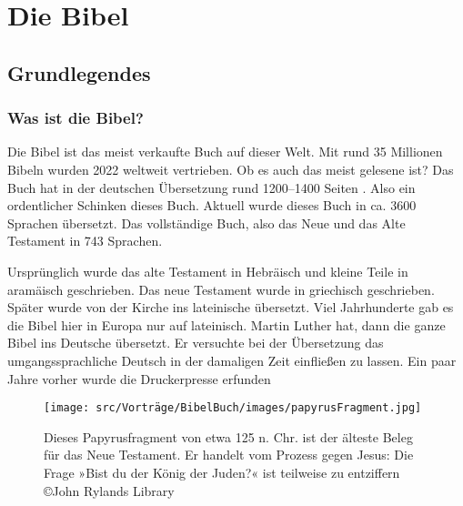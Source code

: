 \section{Die Bibel}
\subsection{Grundlegendes}
\subsubsection{Was ist die Bibel?}
Die Bibel ist das meist verkaufte Buch auf dieser Welt. Mit rund 35 Millionen Bibeln  wurden 2022 weltweit vertrieben. Ob es auch das meist gelesene ist? Das Buch hat in der deutschen Übersetzung rund 1200--1400 Seiten . Also ein ordentlicher Schinken dieses Buch. Aktuell wurde dieses Buch in ca. 3600 Sprachen übersetzt. Das vollständige Buch, also das Neue und das Alte Testament in 743 Sprachen. 

Ursprünglich wurde das alte Testament in Hebräisch und kleine Teile in aramäisch geschrieben. Das neue Testament wurde in griechisch geschrieben. Später wurde von der Kirche ins lateinische übersetzt. Viel Jahrhunderte gab es die Bibel hier in Europa nur auf lateinisch. Martin Luther hat, dann die ganze Bibel ins Deutsche übersetzt. Er versuchte bei der Übersetzung das umgangssprachliche Deutsch in der damaligen Zeit einfließen zu lassen. Ein paar Jahre vorher wurde die Druckerpresse erfunden 
\begin{figure}
    \centering
    \texttt{[image: src/Vorträge/BibelBuch/images/papyrusFragment.jpg]}
    \caption{Dieses Papyrusfragment von etwa 125 n. Chr. ist der älteste Beleg für das Neue Testament. Er handelt vom Prozess gegen Jesus: Die Frage »Bist du der König der Juden?« ist teilweise zu entziffern\\
©John Rylands Library}
    \label{fig:enter-label}
\end{figure}